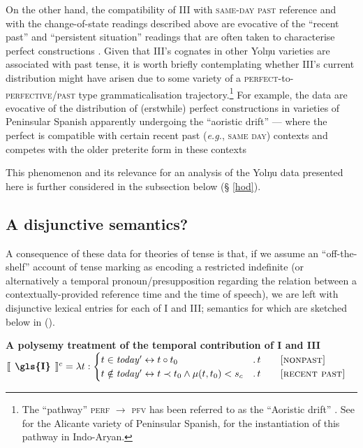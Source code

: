 On the other hand, the compatibility of \gls{III} with \textsc{same-day past} reference and with the change-of-state readings described above are evocative of the ``recent past'' and ``persistent situation'' readings that are often taken to characterise perfect constructions \citep[Ch. 3]{Comrie1976}. Given that \gls{III}'s cognates in other Yolŋu varieties are associated with past tense, it is worth briefly contemplating whether \gls{III}'s current distribution might have arisen due to some variety of a \textsc{perfect}-to-\textsc{perfective/past} type grammaticalisation trajectory.\footnote{The ``pathway'' \textsc{perf $ \to $ pfv} has been referred to as the ``Aoristic drift'' \citep{Schaden2009,Schaden2012}. See \citet{Schwenter1994} for the Alicante variety of Peninsular Spanish, \citet{Condoravdi2014} for the instantiation of this pathway in Indo-Aryan.} For example, the data are evocative of the distribution of (erstwhile) perfect constructions in varieties of Peninsular Spanish apparently undergoing the ``aoristic drift'' --- where the perfect is compatible with certain recent past (\textit{e.g.}, \textsc{same day}) contexts and competes with the older preterite form in these contexts \citetext{\textit{see also}, \citealp{Howe2006} and, for Catalan, \citealp[115\textit{ff}]{CurelliGotor1990}.}


This phenomenon and its relevance for an analysis of the Yolŋu data presented here is  further considered in the subsection below (§ \ref{hod}).





\subsection{A disjunctive semantics?}
A consequence of these data for theories of tense is that, if we assume an ``off-the-shelf'' account of tense marking as encoding a restricted indefinite (or alternatively a temporal pronoun/presupposition regarding the relation between a contextually-provided reference time and the time of speech), we are left with disjunctive lexical entries for each of \gls{I} and \gls{III}; semantics for which are sketched below in (\nextx).


\pex\textbf{A polysemy treatment of the temporal contribution of \gls{I} and \gls{III}}\a$\llbracket\textbf{\phantom{I}\gls{I}\phantom{I}}\rrbracket^{c}=\lambda t:\begin{cases}t\in \mathit{today'}\leftrightarrow t\circ t_0&.\,t\qquad\textsc{[nonpast]}\\
	t\notin \mathit{today'} \leftrightarrow t\prec t_0\wedge\mu(t,t_0)<s_c&.\,t\qquad\textsc{[recent past]}
\end{cases}$

